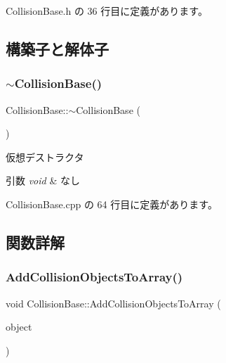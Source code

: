  Collision\+Base.\+h の 36 行目に定義があります。



\subsection{構築子と解体子}
\mbox{\label{class_collision_base_a5ccb28bbf909f23f2df2fd6807b171f5}} 
\subsubsection{\texorpdfstring{$\sim$\+Collision\+Base()}{~CollisionBase()}}
{\footnotesize\ttfamily Collision\+Base\+::$\sim$\+Collision\+Base (\begin{DoxyParamCaption}{ }\end{DoxyParamCaption})\hspace{0.3cm}{\ttfamily [pure virtual]}}



仮想デストラクタ 


\begin{DoxyParams}{引数}
{\em void} & なし \\
\hline
\end{DoxyParams}


 Collision\+Base.\+cpp の 64 行目に定義があります。



\subsection{関数詳解}
\mbox{\label{class_collision_base_ace98d75317a9f56bc6cada7980285b53}} 
\subsubsection{\texorpdfstring{Add\+Collision\+Objects\+To\+Array()}{AddCollisionObjectsToArray()}}
{\footnotesize\ttfamily void Collision\+Base\+::\+Add\+Collision\+Objects\+To\+Array (\begin{DoxyParamCaption}\item[{\mbox{\hyperlink{class_collision_objects}{Collision\+Objects}} $\ast$}]{object }\end{DoxyParamCaption})}



